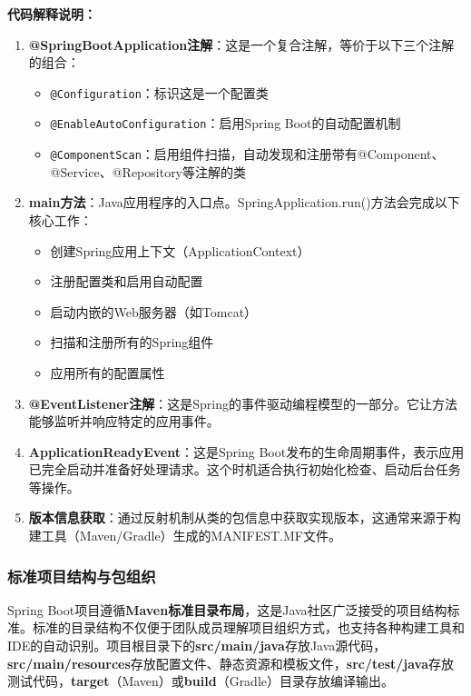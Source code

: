 \textbf{代码解释说明：}

\begin{enumerate}
\def\labelenumi{\arabic{enumi}.}
\item
  \textbf{@SpringBootApplication注解}：这是一个复合注解，等价于以下三个注解的组合：

  \begin{itemize}
  \tightlist
  \item
    \texttt{@Configuration}：标识这是一个配置类
  \item
    \texttt{@EnableAutoConfiguration}：启用Spring Boot的自动配置机制
  \item
    \texttt{@ComponentScan}：启用组件扫描，自动发现和注册带有@Component、@Service、@Repository等注解的类
  \end{itemize}
\item
  \textbf{main方法}：Java应用程序的入口点。SpringApplication.run()方法会完成以下核心工作：

  \begin{itemize}
  \tightlist
  \item
    创建Spring应用上下文（ApplicationContext）
  \item
    注册配置类和启用自动配置
  \item
    启动内嵌的Web服务器（如Tomcat）
  \item
    扫描和注册所有的Spring组件
  \item
    应用所有的配置属性
  \end{itemize}
\item
  \textbf{@EventListener注解}：这是Spring的事件驱动编程模型的一部分。它让方法能够监听并响应特定的应用事件。
\item
  \textbf{ApplicationReadyEvent}：这是Spring Boot发布的生命周期事件，表示应用已完全启动并准备好处理请求。这个时机适合执行初始化检查、启动后台任务等操作。
\item
  \textbf{版本信息获取}：通过反射机制从类的包信息中获取实现版本，这通常来源于构建工具（Maven/Gradle）生成的MANIFEST.MF文件。
\end{enumerate}

\subsubsection{标准项目结构与包组织}\label{ux6807ux51c6ux9879ux76eeux7ed3ux6784ux4e0eux5305ux7ec4ux7ec7}

Spring Boot项目遵循\textbf{Maven标准目录布局}，这是Java社区广泛接受的项目结构标准。标准的目录结构不仅便于团队成员理解项目组织方式，也支持各种构建工具和IDE的自动识别。项目根目录下的\textbf{src/main/java}存放Java源代码，\textbf{src/main/resources}存放配置文件、静态资源和模板文件，\textbf{src/test/java}存放测试代码，\textbf{target}（Maven）或\textbf{build}（Gradle）目录存放编译输出。

